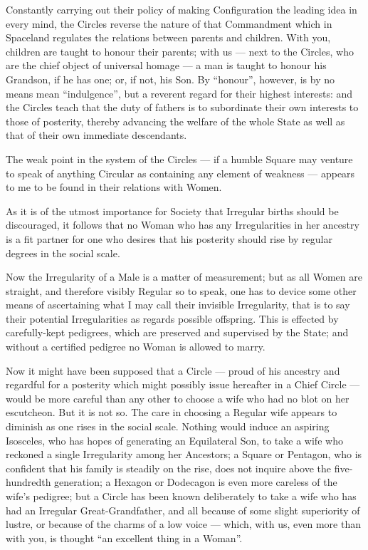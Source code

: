\documentclass[10pt, kindle, oneside]{kindle}
\begin{document}
Constantly carrying out their policy of making Configuration the leading idea
in every mind, the Circles reverse the nature of that Commandment which in
Spaceland regulates the relations between parents and children. With you,
children are taught to honour their parents; with us --- next to the Circles,
who are the chief object of universal homage --- a man is taught to honour his
Grandson, if he has one; or, if not, his Son. By ``honour'', however, is by no
means mean ``indulgence'', but a reverent regard for their highest interests:
and the Circles teach that the duty of fathers is to subordinate their own
interests to those of posterity, thereby advancing the welfare of the whole
State as well as that of their own immediate descendants.

The weak point in the system of the Circles --- if a humble Square may venture
to speak of anything Circular as containing any element of weakness --- appears
to me to be found in their relations with Women.

As it is of the utmost importance for Society that Irregular births should be
discouraged, it follows that no Woman who has any Irregularities in her
ancestry is a fit partner for one who desires that his posterity should rise
by regular degrees in the social scale.

Now the Irregularity of a Male is a matter of measurement; but as all Women
are straight, and therefore visibly Regular so to speak, one has to device
some other means of ascertaining what I may call their invisible Irregularity,
that is to say their potential Irregularities as regards possible offspring.
This is effected by carefully-kept pedigrees, which are preserved and
supervised by the State; and without a certified pedigree no Woman is allowed
to marry.

Now it might have been supposed that a Circle --- proud of his ancestry and
regardful for a posterity which might possibly issue hereafter in a Chief
Circle --- would be more careful than any other to choose a wife who had no blot
on her escutcheon. But it is not so. The care in choosing a Regular wife
appears to diminish as one rises in the social scale. Nothing would induce an
aspiring Isosceles, who has hopes of generating an Equilateral Son, to take a
wife who reckoned a single Irregularity among her Ancestors; a Square or
Pentagon, who is confident that his family is steadily on the rise, does not
inquire above the five-hundredth generation; a Hexagon or Dodecagon is even
more careless of the wife's pedigree; but a Circle has been known deliberately
to take a wife who has had an Irregular Great-Grandfather, and all because of
some slight superiority of lustre, or because of the charms of a low voice ---
which, with us, even more than with you, is thought ``an excellent thing in a
Woman''.
\end{document}

